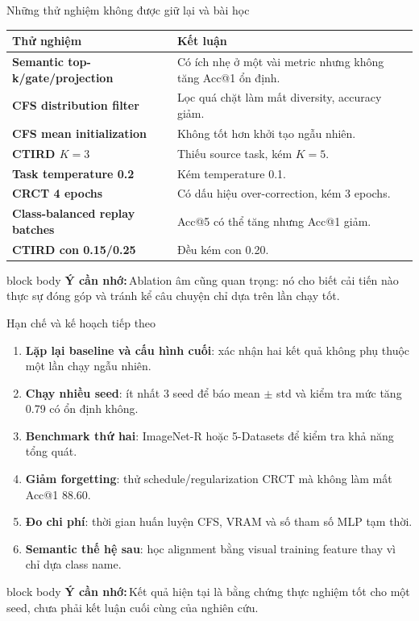 \documentclass[aspectratio=169,10pt]{beamer}
\newcommand{\remember}[1]{%
  \par\vspace{0.12cm}%
  \begin{beamercolorbox}[wd=\linewidth,sep=0.11cm,leftskip=0.08cm,rightskip=0.08cm,rounded=true]{block body}
    \footnotesize\textbf{\color{HRMBlue}Ý cần nhớ:}\,\color{HRMDark}#1
  \end{beamercolorbox}
}
\begin{document}
\begin{frame}{Những thử nghiệm không được giữ lại và bài học}
  \small
  \begin{tabularx}{\textwidth}{>{\bfseries}p{3.25cm} X}
    \toprule
    Thử nghiệm & Kết luận \\
    \midrule
    Semantic top-k/gate/projection & Có ích nhẹ ở một vài metric nhưng không tăng Acc@1 ổn định. \\
    CFS distribution filter & Lọc quá chặt làm mất diversity, accuracy giảm. \\
    CFS mean initialization & Không tốt hơn khởi tạo ngẫu nhiên. \\
    CTIRD $K=3$ & Thiếu source task, kém $K=5$. \\
    Task temperature 0.2 & Kém temperature 0.1. \\
    CRCT 4 epochs & Có dấu hiệu over-correction, kém 3 epochs. \\
    Class-balanced replay batches & Acc@5 có thể tăng nhưng Acc@1 giảm. \\
    CTIRD con 0.15/0.25 & Đều kém con 0.20. \\
    \bottomrule
  \end{tabularx}
  \remember{Ablation âm cũng quan trọng: nó cho biết cải tiến nào thực sự đóng góp và tránh kể câu chuyện chỉ dựa trên lần chạy tốt.}
\end{frame}

\begin{frame}{Hạn chế và kế hoạch tiếp theo}
  \begin{enumerate}\setlength\itemsep{0.35cm}
    \item \textbf{Lặp lại baseline và cấu hình cuối}: xác nhận hai kết quả không phụ thuộc một lần chạy ngẫu nhiên.
    \item \textbf{Chạy nhiều seed}: ít nhất 3 seed để báo mean $\pm$ std và kiểm tra mức tăng 0.79 có ổn định không.
    \item \textbf{Benchmark thứ hai}: ImageNet-R hoặc 5-Datasets để kiểm tra khả năng tổng quát.
    \item \textbf{Giảm forgetting}: thử schedule/regularization CRCT mà không làm mất Acc@1 88.60.
    \item \textbf{Đo chi phí}: thời gian huấn luyện CFS, VRAM và số tham số MLP tạm thời.
    \item \textbf{Semantic thế hệ sau}: học alignment bằng visual training feature thay vì chỉ dựa class name.
  \end{enumerate}
  \remember{Kết quả hiện tại là bằng chứng thực nghiệm tốt cho một seed, chưa phải kết luận cuối cùng của nghiên cứu.}
\end{frame}
\end{document}

